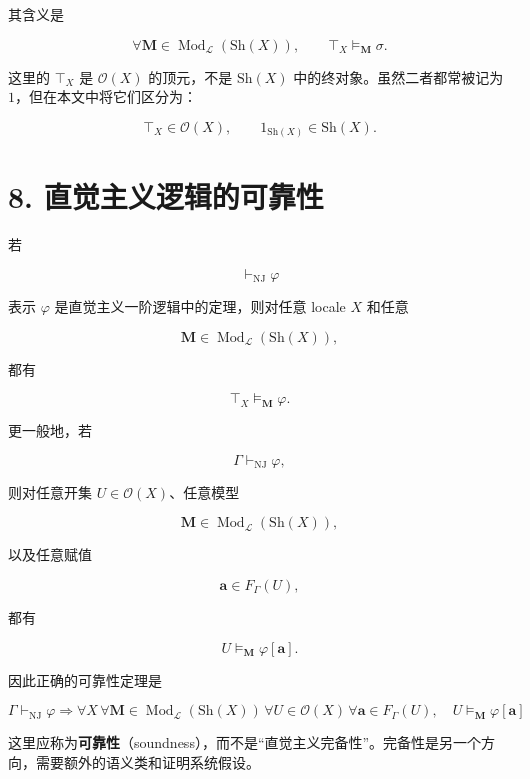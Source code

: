 \documentclass{ctexart}
\begin{document}
其含义是

\[
\forall\mathbf M\in
\operatorname{Mod}_{\mathcal L}(\mathrm{Sh}(X)),
\qquad
\top_X\models_{\mathbf M}\sigma.
\]

这里的 $\top_X$ 是 $\mathcal O(X)$ 的顶元，不是 $\mathrm{Sh}(X)$ 中的终对象。虽然二者都常被记为 $1$，但在本文中将它们区分为：

\[
\top_X\in\mathcal O(X),
\qquad
1_{\mathrm{Sh}(X)}\in\mathrm{Sh}(X).
\]

\section*{8. 直觉主义逻辑的可靠性}

若

\[
\vdash_{\mathrm{NJ}}\varphi
\]

表示 $\varphi$ 是直觉主义一阶逻辑中的定理，则对任意 locale $X$ 和任意

\[
\mathbf M\in
\operatorname{Mod}_{\mathcal L}(\mathrm{Sh}(X)),
\]

都有

\[
\top_X\models_{\mathbf M}\varphi.
\]

更一般地，若

\[
\Gamma\vdash_{\mathrm{NJ}}\varphi,
\]

则对任意开集 $U\in\mathcal O(X)$、任意模型

\[
\mathbf M\in
\operatorname{Mod}_{\mathcal L}(\mathrm{Sh}(X)),
\]

以及任意赋值

\[
\mathbf a\in F_\Gamma(U),
\]

都有

\[
U\models_{\mathbf M}\varphi[\mathbf a].
\]

因此正确的可靠性定理是

\[
\boxed{
\Gamma\vdash_{\mathrm{NJ}}\varphi
\Longrightarrow
\forall X\,
\forall\mathbf M\in
\operatorname{Mod}_{\mathcal L}(\mathrm{Sh}(X))
\,\forall U\in\mathcal O(X)
\,\forall\mathbf a\in F_\Gamma(U),
\quad
U\models_{\mathbf M}\varphi[\mathbf a]
}
\]

这里应称为\textbf{可靠性}（soundness），而不是``直觉主义完备性''。完备性是另一个方向，需要额外的语义类和证明系统假设。
\end{document}
